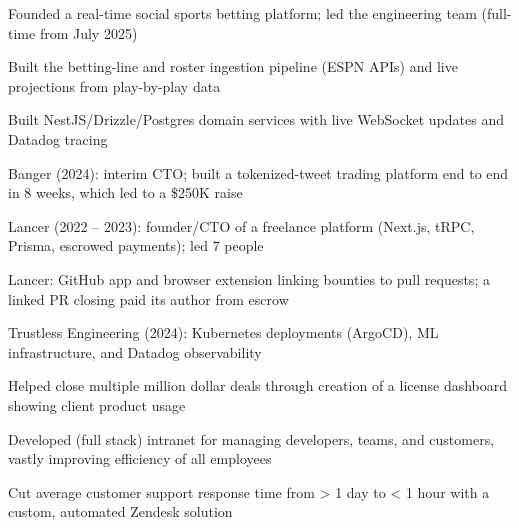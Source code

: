 \documentclass[print]{jack-resume}
\begin{document}
\begin{tightemize}
    \item Founded a real-time social sports betting platform; led the engineering team (full-time from July 2025)
    \item Built the betting-line and roster ingestion pipeline (ESPN APIs) and live projections from play-by-play data
    \item Built NestJS/Drizzle/Postgres domain services with live WebSocket updates and Datadog tracing
\end{tightemize}
\sectionsep

\begin{tightemize}
    \item Banger (2024): interim CTO; built a tokenized-tweet trading platform end to end in 8 weeks, which led to a \$250K raise
    \item Lancer (2022 -- 2023): founder/CTO of a freelance platform (Next.js, tRPC, Prisma, escrowed payments); led 7 people
    \item Lancer: GitHub app and browser extension linking bounties to pull requests; a linked PR closing paid its author from escrow
    \item Trustless Engineering (2024): Kubernetes deployments (ArgoCD), ML infrastructure, and Datadog observability
\end{tightemize}
\sectionsep

\begin{tightemize}
    \item Helped close multiple million dollar deals through creation of a license dashboard showing client product usage
    \item Developed (full stack) intranet for managing developers, teams, and customers, vastly improving efficiency of all employees
    \item Cut average customer support response time from > 1 day to < 1 hour with a custom, automated Zendesk solution
\end{tightemize}
\sectionsep
\end{document}
